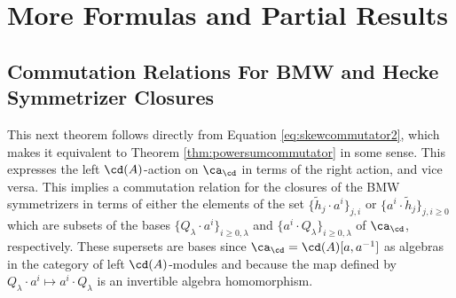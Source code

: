 \chapter{More Formulas and Partial Results}


\section{Commutation Relations For BMW and Hecke Symmetrizer Closures} \label{sec:morecommutationrelations}

This next theorem follows directly from Equation \eqref{eq:skewcommutator2}, which makes it equivalent to Theorem \ref{thm:powersumcommutator} in some sense. This expresses the left $\cd(A)$-action on $\ca_\cd$ in terms of the right action, and vice versa. This implies a commutation relation for the closures of the BMW symmetrizers in terms of either the elements of the set $\{\tilde{h}_j \cdot a^i \}_{j, i}$ or $\{ a^i \cdot \tilde{h}_j \}_{j, i \geq 0}$ which are subsets of the bases $\{ Q_\lambda \cdot a^i \}_{i \geq 0, \lambda}$ and $\{ a^i \cdot Q_\lambda \}_{i \geq 0, \lambda}$ of $\ca_\cd$, respectively. These supersets are bases since $\ca_\cd = \cd(A)[a, a^{-1}]$ as algebras in the category of left $\cd(A)$-modules and because the map defined by $Q_\lambda \cdot a^i \mapsto a^i \cdot Q_\lambda$ is an invertible algebra homomorphism. 

